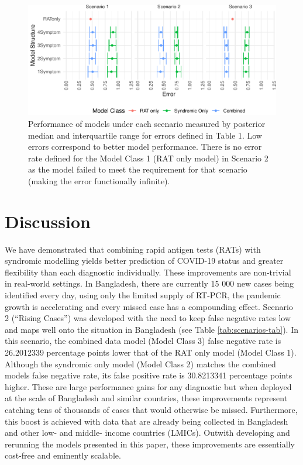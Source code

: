 \documentclass[]{elsarticle} %
\begin{document}
\begin{figure}
\centering
\includegraphics{0501_MainText_files/figure-latex/scenario-plot-1.pdf}
\caption{\label{fig:scenario-plot}Performance of models under each scenario measured by posterior median and interquartile range for errors defined in Table 1. Low errors correspond to better model performance. There is no error rate defined for the Model Class 1 (RAT only model) in Scenario 2 as the model failed to meet the requirement for that scenario (making the error functionally infinite).}
\end{figure}

\hypertarget{discussion}{%
\section{Discussion}\label{discussion}}

We have demonstrated that combining rapid antigen tests (RATs) with syndromic modelling yields better prediction of COVID-19 status and greater flexibility than each diagnostic individually.
These improvements are non-trivial in real-world settings.
In Bangladesh, there are currently 15 000 new cases being identified every day, using only the limited supply of RT-PCR, the pandemic growth is accelerating and every missed case has a compounding effect.
Scenario 2 (``Rising Cases'') was developed with the need to keep false negative rates low and maps well onto the situation in Bangladesh (see Table \ref{tab:scenarios-tab}).
In this scenario, the combined data model (Model Class 3) false negative rate is
26.2012339 percentage points lower that of the RAT only model (Model Class 1).
Although the syndromic only model (Model Class 2) matches the combined models false negative rate, its false positive rate is
30.8213341 percentage points higher.
These are large performance gains for any diagnostic but when deployed at the scale of Bangladesh and similar countries, these improvements represent catching tens of thousands of cases that would otherwise be missed.
Furthermore, this boost is achieved with data that are already being collected in Bangladesh and other low- and middle- income countries (LMICs).
Outwith developing and rerunning the models presented in this paper, these improvements are essentially cost-free and eminently scalable.
\end{document}
